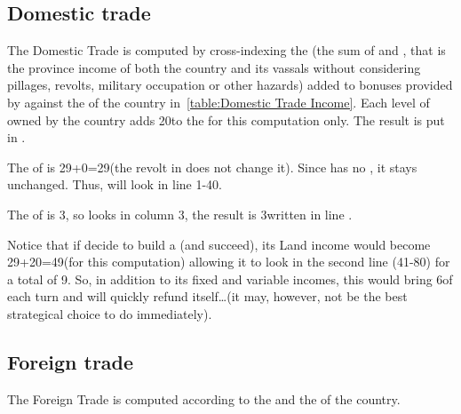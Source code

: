 \subsection{Domestic trade}
\aparag The Domestic Trade is computed by cross-indexing the
 (the sum of  and , that is the
province income of both the country and its vassals without considering
pillages, revolts, military occupation or other hazards)
added to bonuses provided by \MNU against the \DTI of the country
in~\ref{table:Domestic Trade Income}.
\bparag Each level of  \MNU owned by the country adds
20\ducats to the  for this computation
only.
\bparag The result is put in .


\begin{exemple}
  The  of \POR is 29+0=29\ducats (the
  revolt in \provinceBeira does not change it). Since \POR has no
   \MNU, it stays unchanged. Thus, \POR will look in line
  1-40.

  The \DTI of \POR is 3, so \POR looks in column 3, the result is
  3\ducats written in line .

  Notice that if \POR decide to build a  \MNU (and
  succeed), its Land income would become 29+20=49\ducats (for this
  computation) allowing it to look in the second line (41-80) for a
  total of 9\ducats. So, in addition to its fixed and variable incomes,
  this \MNU would bring 6\ducats of  each
  turn and will quickly refund itself\ldots (it may, however, not be the
  best strategical choice to do immediately).
\end{exemple}

\subsection{Foreign trade}\label{chIncomes:Foreign Trade}
\aparag The Foreign Trade is computed according to the  and the \FTI of the country.

